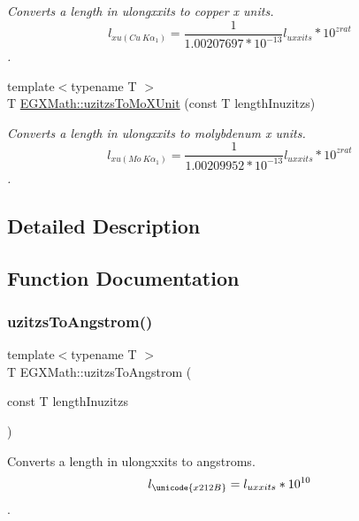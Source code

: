 \begin{DoxyCompactItemize}
\begin{DoxyCompactList}\small\item\em Converts a length in ulongxxits to copper x units. \[ l_{xu(Cu\ K\alpha_1)}= \frac{1}{1.00207697*10^{-13}} l_{uxxits} * 10^{zrat}\]. \end{DoxyCompactList}\item 
{\footnotesize template$<$typename T $>$ }\\T \mbox{\hyperlink{group___e_g_x_math-_conversions-_length_conversions-_non-_s_i-uzitzs-_non-_s_i_ga64b556911b0bb06cf315aa02f5e2d379}{E\+G\+X\+Math\+::uzitzs\+To\+Mo\+X\+Unit}} (const T length\+Inuzitzs)
\begin{DoxyCompactList}\small\item\em Converts a length in ulongxxits to molybdenum x units. \[ l_{xu(Mo\ K\alpha_1)}=\frac{1}{1.00209952*10^{-13}} l_{uxxits} * 10^{zrat}\]. \end{DoxyCompactList}\end{DoxyCompactItemize}


\subsection{Detailed Description}


\subsection{Function Documentation}
\mbox{\label{group___e_g_x_math-_conversions-_length_conversions-_non-_s_i-uzitzs-_non-_s_i_gaaaecee65b1db5abcc71e18526e7073eb}} 
\subsubsection{\texorpdfstring{uzitzs\+To\+Angstrom()}{uzitzsToAngstrom()}}
{\footnotesize\ttfamily template$<$typename T $>$ \\
T E\+G\+X\+Math\+::uzitzs\+To\+Angstrom (\begin{DoxyParamCaption}\item[{const T}]{length\+Inuzitzs }\end{DoxyParamCaption})}



Converts a length in ulongxxits to angstroms. \[ l_{\unicode{x212B}}=l_{uxxits} * 10^{10} \]. 

